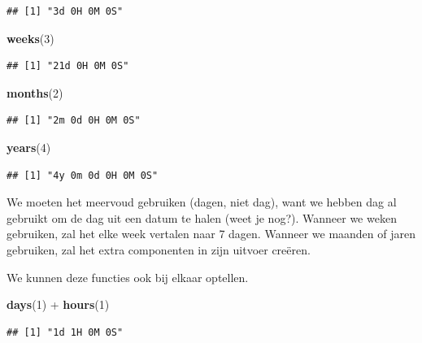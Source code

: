 \documentclass[]{tufte-book}
\newenvironment{Shaded}{}{}
\newcommand{\DecValTok}[1]{\textcolor[rgb]{0.25,0.63,0.44}{#1}}
\newcommand{\KeywordTok}[1]{\textcolor[rgb]{0.00,0.44,0.13}{\textbf{#1}}}
\newcommand{\NormalTok}[1]{#1}
\newcommand{\OperatorTok}[1]{\textcolor[rgb]{0.40,0.40,0.40}{#1}}
\newcommand{\StringTok}[1]{\textcolor[rgb]{0.25,0.44,0.63}{#1}}
\begin{document}
\begin{verbatim}
## [1] "3d 0H 0M 0S"
\end{verbatim}

\begin{Shaded}
\begin{Highlighting}[]
\KeywordTok{weeks}\NormalTok{(}\DecValTok{3}\NormalTok{)}
\end{Highlighting}
\end{Shaded}

\begin{verbatim}
## [1] "21d 0H 0M 0S"
\end{verbatim}

\begin{Shaded}
\begin{Highlighting}[]
\KeywordTok{months}\NormalTok{(}\DecValTok{2}\NormalTok{)}
\end{Highlighting}
\end{Shaded}

\begin{verbatim}
## [1] "2m 0d 0H 0M 0S"
\end{verbatim}

\begin{Shaded}
\begin{Highlighting}[]
\KeywordTok{years}\NormalTok{(}\DecValTok{4}\NormalTok{)}
\end{Highlighting}
\end{Shaded}

\begin{verbatim}
## [1] "4y 0m 0d 0H 0M 0S"
\end{verbatim}

We moeten het meervoud gebruiken (dagen, niet dag), want we hebben dag al gebruikt om de dag uit een datum te halen (weet je nog?). Wanneer we weken gebruiken, zal het elke week vertalen naar 7 dagen. Wanneer we maanden of jaren gebruiken, zal het extra componenten in zijn uitvoer creëren.

We kunnen deze functies ook bij elkaar optellen.

\begin{Shaded}
\begin{Highlighting}[]
\KeywordTok{days}\NormalTok{(}\DecValTok{1}\NormalTok{) }\OperatorTok{+}\StringTok{ }\KeywordTok{hours}\NormalTok{(}\DecValTok{1}\NormalTok{)}
\end{Highlighting}
\end{Shaded}

\begin{verbatim}
## [1] "1d 1H 0M 0S"
\end{verbatim}
\end{document}
